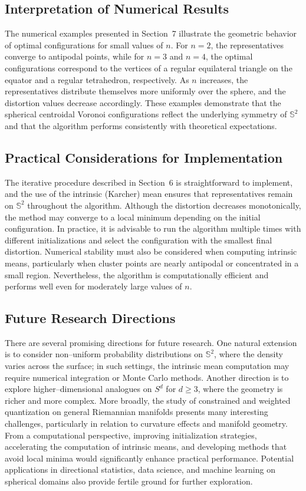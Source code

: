 \documentclass[12pt, reqno]{amsart}
\theoremstyle{plain}
\theoremstyle{definition}
\newcommand{\D}[1]{\mathbb{#1}}%
\begin{document}
 

\subsection{Interpretation of Numerical Results}
The numerical examples presented in Section~7 illustrate the geometric behavior of optimal configurations
for small values of $n$. For $n=2$, the representatives converge to antipodal points, while for
$n=3$ and $n=4$, the optimal configurations correspond to the vertices of a regular equilateral triangle
on the equator and a regular tetrahedron, respectively. As $n$ increases, the representatives distribute
themselves more uniformly over the sphere, and the distortion values decrease accordingly. These examples
demonstrate that the spherical centroidal Voronoi configurations reflect the underlying symmetry of $\D S^2$
and that the algorithm performs consistently with theoretical expectations.

 
\subsection{Practical Considerations for Implementation}
The iterative procedure described in Section~6 is straightforward to implement, and the use of the intrinsic
(Karcher) mean ensures that representatives remain on $\D S^2$ throughout the algorithm. Although the
distortion decreases monotonically, the method may converge to a local minimum depending on the initial
configuration. In practice, it is advisable to run the algorithm multiple times with different initializations and
select the configuration with the smallest final distortion. Numerical stability must also be considered when
computing intrinsic means, particularly when cluster points are nearly antipodal or concentrated in a small
region. Nevertheless, the algorithm is computationally efficient and performs well even for moderately large
values of $n$.
\subsection{Future Research Directions}
There are several promising directions for future research. One natural extension is to consider non--uniform
probability distributions on $\D S^2$, where the density varies across the surface; in such settings, the intrinsic
mean computation may require numerical integration or Monte Carlo methods. Another direction is to explore
higher--dimensional analogues on $S^d$ for $d \ge 3$, where the geometry is richer and more complex. More
broadly, the study of constrained and weighted quantization on general Riemannian manifolds presents many
interesting challenges, particularly in relation to curvature effects and manifold geometry. From a computational
perspective, improving initialization strategies, accelerating the computation of intrinsic means, and developing
methods that avoid local minima would significantly enhance practical performance. Potential applications in
directional statistics, data science, and machine learning on spherical domains also provide fertile ground for
further exploration.
 
\end{document}

